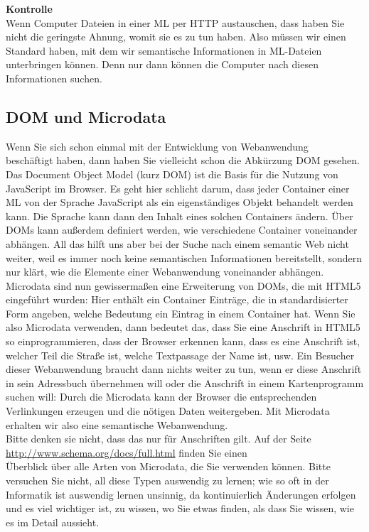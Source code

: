 \textbf{Kontrolle}\\

Wenn Computer Dateien in einer ML per HTTP austauschen, dass haben Sie nicht die geringste Ahnung, womit sie es zu tun haben. Also müssen wir einen Standard haben, mit dem wir semantische Informationen in ML-Dateien unterbringen können. Denn nur dann können die Computer nach diesen Informationen suchen.

\subsection{DOM und Microdata}

Wenn Sie sich schon einmal mit der Entwicklung von Webanwendung\\ beschäftigt haben, dann haben Sie vielleicht schon die Abkürzung DOM gesehen. Das Document Object Model (kurz DOM) ist die Basis für die Nutzung von JavaScript im Browser. Es geht hier schlicht darum, dass jeder Container einer ML von der Sprache JavaScript als ein eigenständiges Objekt behandelt werden kann. Die Sprache kann dann den Inhalt eines solchen Containers ändern. Über DOMs kann außerdem definiert werden, wie verschiedene Container voneinander abhängen. All das hilft uns aber bei der Suche nach einem semantic Web nicht weiter, weil es immer noch keine semantischen Informationen bereitstellt, sondern nur klärt, wie die Elemente einer Webanwendung voneinander abhängen.\\

Microdata sind nun gewissermaßen eine Erweiterung von DOMs, die mit HTML5 eingeführt wurden: Hier enthält ein Container Einträge, die in standardisierter Form angeben, welche Bedeutung ein Eintrag in einem Container hat. Wenn Sie also Microdata verwenden, dann bedeutet das, dass Sie eine Anschrift in HTML5 so einprogrammieren, dass der Browser erkennen kann, dass es eine Anschrift ist, welcher Teil die Straße ist, welche Textpassage der Name ist, usw. Ein Besucher dieser Webanwendung braucht dann nichts weiter zu tun, wenn er diese Anschrift in sein Adressbuch übernehmen will oder die Anschrift in einem Kartenprogramm suchen will: Durch die Microdata kann der Browser die entsprechenden Verlinkungen erzeugen und die nötigen Daten weitergeben. Mit Microdata erhalten wir also eine semantische Webanwendung.\\

Bitte denken sie nicht, dass das nur für Anschriften gilt. Auf der Seite \url{http://www.schema.org/docs/full.html} finden Sie einen\\ Überblick über alle Arten von Microdata, die Sie verwenden können. Bitte versuchen Sie nicht, all diese Typen auswendig zu lernen; wie so oft in der Informatik ist auswendig lernen unsinnig, da kontinuierlich Änderungen erfolgen und es viel wichtiger ist, zu wissen, wo Sie etwas finden, als dass Sie wissen, wie es im Detail aussieht.\\

